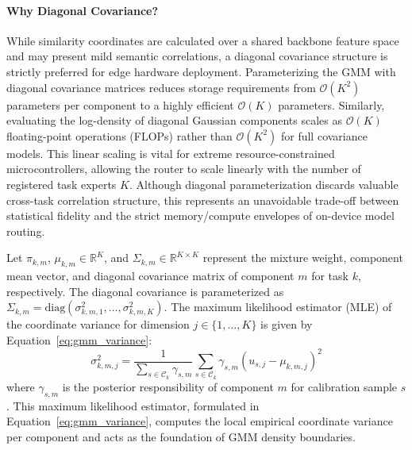 \paragraph{Why Diagonal Covariance?} While similarity coordinates are calculated over a shared backbone feature space and may present mild semantic correlations, a diagonal covariance structure is strictly preferred for edge hardware deployment. Parameterizing the GMM with diagonal covariance matrices reduces storage requirements from $\mathcal{O}(K^2)$ parameters per component to a highly efficient $\mathcal{O}(K)$ parameters. Similarly, evaluating the log-density of diagonal Gaussian components scales as $\mathcal{O}(K)$ floating-point operations (FLOPs) rather than $\mathcal{O}(K^2)$ for full covariance models. This linear scaling is vital for extreme resource-constrained microcontrollers, allowing the router to scale linearly with the number of registered task experts $K$. Although diagonal parameterization discards valuable cross-task correlation structure, this represents an unavoidable trade-off between statistical fidelity and the strict memory/compute envelopes of on-device model routing.

Let $\pi_{k, m}$, $\mu_{k, m} \in \mathbb{R}^K$, and $\Sigma_{k, m} \in \mathbb{R}^{K \times K}$ represent the mixture weight, component mean vector, and diagonal covariance matrix of component $m$ for task $k$, respectively. The diagonal covariance is parameterized as $\Sigma_{k, m} = \text{diag}(\sigma^2_{k, m, 1}, \dots, \sigma^2_{k, m, K})$. The maximum likelihood estimator (MLE) of the coordinate variance for dimension $j \in \{1, \dots, K\}$ is given by Equation~\ref{eq:gmm_variance}:
\begin{equation}
\label{eq:gmm_variance}
    \sigma^2_{k, m, j} = \frac{1}{\sum_{s \in \mathcal{C}_k} \gamma_{s, m}} \sum_{s \in \mathcal{C}_k} \gamma_{s, m} (u_{s, j} - \mu_{k, m, j})^2
\end{equation}
where $\gamma_{s, m}$ is the posterior responsibility of component $m$ for calibration sample $s$. This maximum likelihood estimator, formulated in Equation~\ref{eq:gmm_variance}, computes the local empirical coordinate variance per component and acts as the foundation of GMM density boundaries. 

